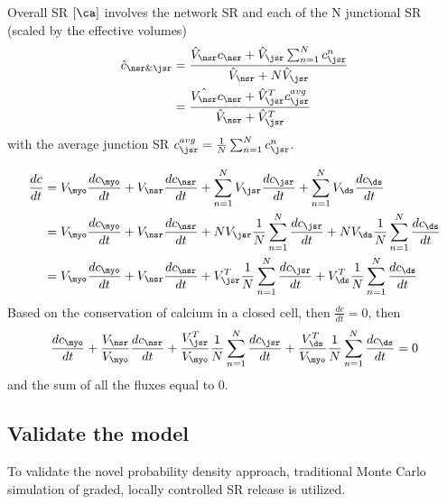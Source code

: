 Overall SR $[\ca]$ involves the network SR and each of the N
junctional SR (scaled by the effective volumes)
\begin{equation}
  \label{eq:1014}
  \begin{split}
    \hat{c}_{\nsr\&\jsr} &= \frac{\hat{V}_\nsr c_\nsr+\hat{V}_\jsr
      \sum^N_{n=1} c^n_\jsr}{\hat{V}_\nsr+N \hat{V}_\jsr} \\
    &= \frac{\hat{V_\nsr} c_\nsr+\hat{V}^T_\jsr
      c^{avg}_\jsr}{\hat{V}_\nsr+\hat{V}^T_\jsr} 
  \end{split}  
\end{equation}
with the average junction SR $c^{avg}_\jsr=\frac{1}{N}\sum^N_{n=1}c^n_\jsr$.

\begin{framed}
  
  \begin{equation}
    \label{eq:1011}
    \begin{split}
      \frac{dc}{dt} &= V_\myo \frac{dc_\myo}{dt} + V_\nsr
      \frac{dc_\nsr}{dt} + \sum^N_{n=1} V_\jsr \frac{dc_\jsr}{dt} +
      \sum^N_{n=1} V_\ds \frac{dc_\ds}{dt} \\
      &= V_\myo \frac{dc_\myo}{dt} + V_\nsr
      \frac{dc_\nsr}{dt} + NV_\jsr \frac{1}{N}\sum^N_{n=1} \frac{dc_\jsr}{dt} +
      NV_\ds \frac{1}{N}\sum^N_{n=1} \frac{dc_\ds}{dt} \\
      &= V_\myo \frac{dc_\myo}{dt} + V_\nsr
      \frac{dc_\nsr}{dt} + V^T_\jsr \frac{1}{N}\sum^N_{n=1} \frac{dc_\jsr}{dt} +
      V^T_\ds \frac{1}{N}\sum^N_{n=1} \frac{dc_\ds}{dt} 
    \end{split}
  \end{equation}
  Based on the conservation of calcium in a closed cell, then
  $\frac{dc}{dt}=0$, then 
  \begin{equation}
    \label{eq:1012}
    \frac{dc_\myo}{dt} + \frac{V_\nsr}{V_\myo}
    \frac{dc_\nsr}{dt} + \frac{V^T_\jsr}{V_\myo} \frac{1}{N}\sum^N_{n=1} \frac{dc_\jsr}{dt} +
    \frac{V^T_\ds}{V_\myo} \frac{1}{N}\sum^N_{n=1} \frac{dc_\ds}{dt} = 0 
  \end{equation}
  and the sum of all the fluxes equal to 0. 
\end{framed}

\subsection{Validate the model}
\label{sec:validate-model}

To validate the novel probability density approach, traditional Monte
Carlo simulation of graded, locally controlled SR  release
is utilized.

